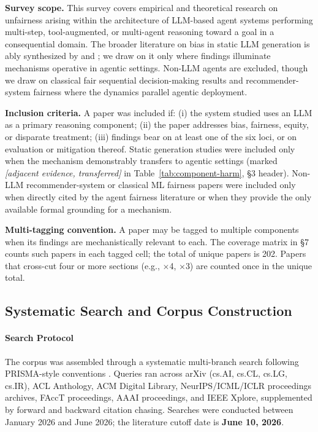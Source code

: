 \documentclass[acmsmall,nonacm]{acmart}
\begin{document}
\textbf{Survey scope.} This survey covers empirical and theoretical research on unfairness arising within the architecture of LLM-based agent systems performing multi-step, tool-augmented, or multi-agent reasoning toward a goal in a consequential domain. The broader literature on bias in static LLM generation is ably synthesized by \cite{gallegos2024bias} and \cite{chu2024fairness}; we draw on it only where findings illuminate mechanisms operative in agentic settings. Non-LLM agents are excluded, though we draw on classical fair sequential decision-making results \cite{hu2022achieving,xu2024adapting} and recommender-system fairness \cite{zehlike2022fairness,wang2023survey} where the dynamics parallel agentic deployment.

\textbf{Inclusion criteria.} A paper was included if: (i) the system studied uses an LLM as a primary reasoning component; (ii) the paper addresses bias, fairness, equity, or disparate treatment; (iii) findings bear on at least one of the six loci, or on evaluation or mitigation thereof. Static generation studies were included only when the mechanism demonstrably transfers to agentic settings (marked \emph{[adjacent evidence, transferred]} in Table~\ref{tab:component-harm}, \S{}3 header). Non-LLM recommender-system or classical ML fairness papers were included only when directly cited by the agent fairness literature or when they provide the only available formal grounding for a mechanism.

\textbf{Multi-tagging convention.} A paper may be tagged to multiple components when its findings are mechanistically relevant to each. The coverage matrix in \S{}7 counts such papers in each tagged cell; the total of unique papers is 202. Papers that cross-cut four or more sections (e.g., \cite{gallegos2024bias} $\times$4, \cite{fan2024fairmt} $\times$3) are counted once in the unique total.


\subsection{Systematic Search and Corpus Construction}

\paragraph{Search Protocol}

The corpus was assembled through a systematic multi-branch search following PRISMA-style conventions \cite{moher2009preferred}. Queries ran across arXiv (cs.AI, cs.CL, cs.LG, cs.IR), ACL Anthology, ACM Digital Library, NeurIPS\allowbreak/\allowbreak ICML\allowbreak/\allowbreak ICLR proceedings archives, FAccT proceedings, AAAI proceedings, and IEEE Xplore, supplemented by forward and backward citation chasing. Searches were conducted between January 2026 and June 2026; the literature cutoff date is \textbf{June 10, 2026}.
\end{document}
